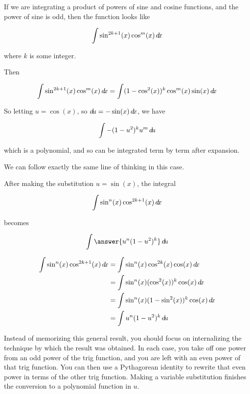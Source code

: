 \documentclass{ximera}
\begin{document}
\begin{explanation}
If we are integrating a product of powers of sine and cosine functions, and the power of sine is odd, then the function looks like

\[
\int \sin^{2k+1}(x) \cos^m(x) \mathop{}\!d\! x
\]

where $k$ is some integer. 

Then

\[
\int \sin^{2k+1}(x) \cos^m(x) \mathop{}\!d\! x = \int (1-\cos^2(x))^k \cos^m(x) \sin(x)\mathop{}\!d\! x 
\]

So letting $u = \cos(x)$, so $\mathop{}\!d\! u =-\sin(x) \mathop{}\!d\! x$, we have

\[
\int -(1-u^2)^k u^m \mathop{}\!d\! u
\]

which is a polynomial, and so can be integrated term by term after expansion.
\end{explanation}

\begin{explanation}
We can follow exactly the same line of thinking in this case.

\begin{question}
	After making the substitution $u = \sin(x)$, the integral
	
	\[
	\int \sin^n(x) \cos^{2k+1}(x) \mathop{}\!d\! x
	\]
	
	becomes
	
	\[
	\int \answer{ u^n(1-u^2)^k} \d u
	\]
	
	\begin{hint}
		\begin{align*}
			\int \sin^n(x) \cos^{2k+1}(x) \d x &= \int \sin^n(x) \cos^{2k}(x) \cos(x) \d x\\
				&=\int \sin^n(x) (\cos^2(x))^k \cos(x)\d x\\
				&=\int \sin^n(x)(1-\sin^2(x))^k \cos(x) \d x\\
				&=\int u^n(1-u^2)^k \d u
		\end{align*}
	\end{hint}
\end{question}
\end{explanation}

\begin{warning}
Instead of memorizing this general result, you should focus on internalizing the technique by which the result was obtained.  In each case, you take off one power from an odd power of the trig function, and you are left with an even power of that trig function.  You can then use a Pythagorean identity to rewrite that even power in terms of the other trig function.  Making a variable substitution finishes the conversion to a polynomial function in $u$.
\end{warning}
\end{document}
